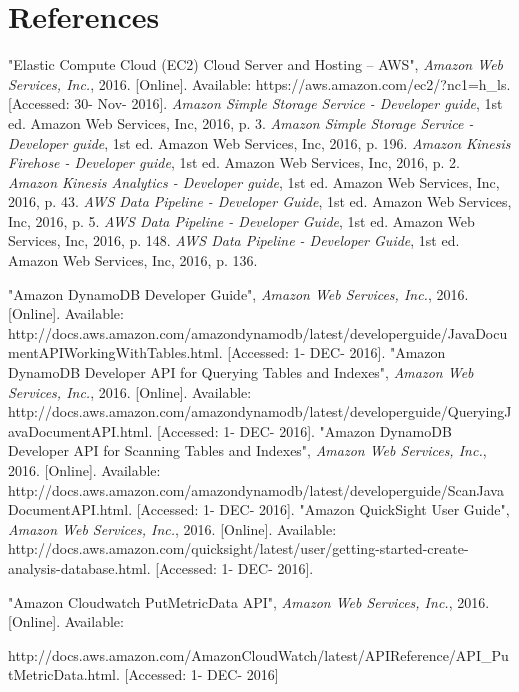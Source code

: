 \section{References}
\begin{thebibliography}{10}
   	"Elastic Compute Cloud (EC2) Cloud Server and Hosting – AWS", \textit{Amazon Web Services, Inc.}, 2016. [Online]. Available: https://aws.amazon.com/ec2/?nc1=h\_ls. [Accessed: 30- Nov- 2016].
    \textit{Amazon Simple Storage Service - Developer guide}, 1st ed. Amazon Web Services, Inc, 2016, p. 3.
  	\textit{Amazon Simple Storage Service - Developer guide}, 1st ed. Amazon Web Services, Inc, 2016, p. 196.
    \textit{Amazon Kinesis Firehose - Developer guide}, 1st ed. Amazon Web Services, Inc, 2016, p. 2.
  	\textit{Amazon Kinesis Analytics - Developer guide}, 1st ed. Amazon Web Services, Inc, 2016, p. 43.
  	\textit{AWS Data Pipeline - Developer Guide}, 1st ed. Amazon Web Services, Inc, 2016, p. 5.
  	\textit{AWS Data Pipeline - Developer Guide}, 1st ed. Amazon Web Services, Inc, 2016, p. 148.
  	\textit{AWS Data Pipeline - Developer Guide}, 1st ed. Amazon Web Services, Inc, 2016, p. 136.
  
  	"Amazon DynamoDB Developer Guide", \textit{Amazon Web Services, Inc.}, 2016. [Online]. Available: 	      http://docs.aws.amazon.com/amazondynamodb/latest/developerguide/JavaDocumentAPIWorkingWithTables.html. [Accessed: 1- DEC- 2016].
  	"Amazon DynamoDB Developer API for Querying Tables and Indexes", \textit{Amazon Web Services, Inc.}, 2016. [Online]. Available:
  http://docs.aws.amazon.com/amazondynamodb/latest/developerguide/QueryingJavaDocumentAPI.html. [Accessed: 1- DEC- 2016].
  	"Amazon DynamoDB Developer API for Scanning Tables and Indexes", \textit{Amazon Web Services, Inc.}, 2016. [Online]. Available:
  http://docs.aws.amazon.com/amazondynamodb/latest/developerguide/ScanJavaDocumentAPI.html. [Accessed: 1- DEC- 2016].
  	"Amazon QuickSight User Guide", \textit{Amazon Web Services, Inc.}, 2016. [Online]. Available:
  http://docs.aws.amazon.com/quicksight/latest/user/getting-started-create-analysis-database.html. [Accessed: 1- DEC- 2016].
  
	"Amazon Cloudwatch PutMetricData API", \textit{Amazon Web Services, Inc.}, 2016. [Online]. Available:
    
http://docs.aws.amazon.com/AmazonCloudWatch/latest/APIReference/API\_PutMetricData.html. [Accessed: 1- DEC- 2016]


\end{thebibliography}
